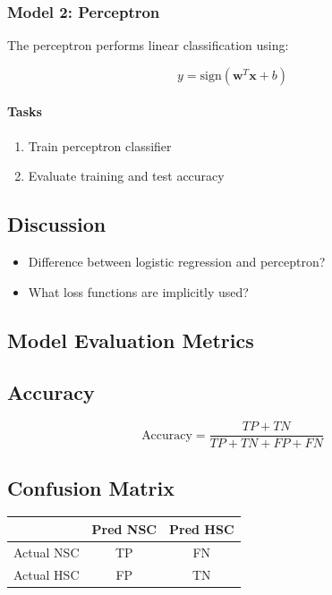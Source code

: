 \documentclass[12pt]{article}
\begin{document}
\subsubsection*{Model 2: Perceptron}

The perceptron performs linear classification using:

\[
y = \text{sign}(\mathbf{w}^T \mathbf{x} + b)
\]

\paragraph{Tasks}

\begin{enumerate}
    \item Train perceptron classifier
    \item Evaluate training and test accuracy
\end{enumerate}

\subsection*{Discussion}

\begin{itemize}
    \item Difference between logistic regression and perceptron?
    \item What loss functions are implicitly used?
\end{itemize}

\subsection*{Model Evaluation Metrics}

\subsection*{Accuracy}

\[
\text{Accuracy} = \frac{TP + TN}{TP + TN + FP + FN}
\]

\subsection*{Confusion Matrix}

\begin{center}
\begin{tabular}{c|cc}
 & Pred NSC & Pred HSC \\
\hline
Actual NSC & TP & FN \\
Actual HSC & FP & TN
\end{tabular}
\end{center}
\end{document}
